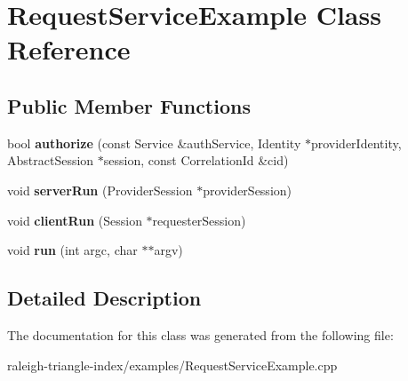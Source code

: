 \section{Request\+Service\+Example Class Reference}
\label{class_request_service_example}
\subsection*{Public Member Functions}
\begin{DoxyCompactItemize}
\item 
bool {\bfseries authorize} (const Service \&auth\+Service, Identity $\ast$provider\+Identity, Abstract\+Session $\ast$session, const Correlation\+Id \&cid)\label{class_request_service_example_ab3321b04782e405059622ef54bf6b5c7}

\item 
void {\bfseries server\+Run} (Provider\+Session $\ast$provider\+Session)\label{class_request_service_example_a1d73dcbadba2511f22eb33eadf7fd63c}

\item 
void {\bfseries client\+Run} (Session $\ast$requester\+Session)\label{class_request_service_example_a65ed1a66052721ba7d426ae523c518ab}

\item 
void {\bfseries run} (int argc, char $\ast$$\ast$argv)\label{class_request_service_example_ad1591ad6c3b5c25d533c59ac09bcc5fb}

\end{DoxyCompactItemize}


\subsection{Detailed Description}


The documentation for this class was generated from the following file\+:\begin{DoxyCompactItemize}
\item 
raleigh-\/triangle-\/index/examples/Request\+Service\+Example.\+cpp\end{DoxyCompactItemize}
